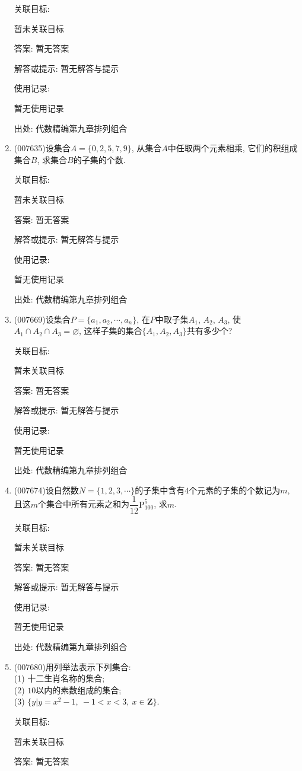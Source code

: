 \documentclass[10pt,a4paper]{article}
\begin{document}
\begin{enumerate}[1.]
关联目标:

暂未关联目标

答案: 暂无答案

解答或提示: 暂无解答与提示

使用记录:

暂无使用记录


出处: 代数精编第九章排列组合
\item { (007635)}设集合$A=\{0,2,5,7,9\}$, 从集合$A$中任取两个元素相乘, 它们的积组成集合$B$, 求集合$B$的子集的个数.


关联目标:

暂未关联目标

答案: 暂无答案

解答或提示: 暂无解答与提示

使用记录:

暂无使用记录


出处: 代数精编第九章排列组合
\item { (007669)}设集合$P=\{a_1,a_2,\cdots ,a_n\}$, 在$P$中取子集$A_1$, $A_2$, $A_3$, 使$A_1\cap A_2\cap A_3=\varnothing$, 这样子集的集合$\{A_1,A_2,A_3\}$共有多少个?


关联目标:

暂未关联目标

答案: 暂无答案

解答或提示: 暂无解答与提示

使用记录:

暂无使用记录


出处: 代数精编第九章排列组合
\item { (007674)}设自然数$N=\{1,2,3,\cdots\}$的子集中含有$4$个元素的子集的个数记为$m$, 且这$m$个集合中所有元素之和为$\dfrac 1{12}\mathrm{P}_{100}^5$, 求$m$.


关联目标:

暂未关联目标

答案: 暂无答案

解答或提示: 暂无解答与提示

使用记录:

暂无使用记录


出处: 代数精编第九章排列组合
\item { (007680)}用列举法表示下列集合:\\
(1) 十二生肖名称的集合;\\
(2) $10$以内的素数组成的集合;\\
(3) $\{y|y=x^2-1, \ -1<x<3, \ x\in \mathbf{Z}\}$.


关联目标:

暂未关联目标

答案: 暂无答案


\end{enumerate}
\end{document}
